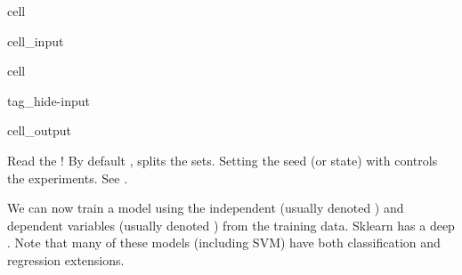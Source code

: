 \documentclass[letterpaper,10pt,english]{jupyterBook}
\begin{document}
\begin{sphinxuseclass}{cell}\begin{sphinxVerbatimInput}

\begin{sphinxuseclass}{cell_input}
\begin{sphinxVerbatim}[commandchars=\\\{\}]
   
   

        
\end{sphinxVerbatim}

\end{sphinxuseclass}\end{sphinxVerbatimInput}

\end{sphinxuseclass}
\begin{sphinxuseclass}{cell}
\begin{sphinxuseclass}{tag_hide-input}\begin{sphinxVerbatimOutput}

\begin{sphinxuseclass}{cell_output}
\end{sphinxuseclass}\end{sphinxVerbatimOutput}

\end{sphinxuseclass}
\end{sphinxuseclass}
\sphinxAtStartPar
Read the ! By default ,  splits the sets. Setting the seed (or state) with  controls the experiments. See .

\sphinxAtStartPar
We can now train a model using the independent (usually denoted ) and dependent variables (usually denoted ) from the training data. Sklearn has a deep . Note that many of these models (including SVM) have both classification and regression extensions.
\end{document}
